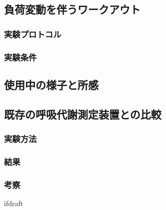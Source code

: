 \subsection{負荷変動を伴うワークアウト}

\subsubsection{実験プロトコル}

\subsubsection{実験条件}

\subsection{使用中の様子と所感}

\subsection{既存の呼吸代謝測定装置との比較}

\subsubsection{実験方法}

\subsubsection{結果}

\subsubsection{考察}

\expandafter\ifx\csname ifdraft\endcsname\relax
  
\fi
